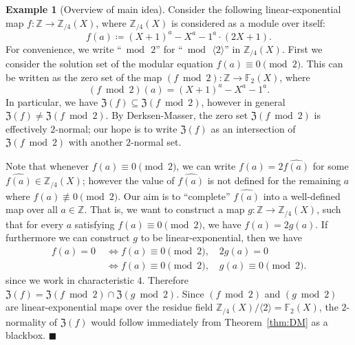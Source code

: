 \documentclass[letterpaper, 11pt, thm-restate]{article}
\numberwithin{equation}{section}
\newcommand{\Z}{\mathbb{Z}}
\newcommand{\F}{\mathbb{F}}
\newcommand{\mZ}{\mathfrak{Z}}
\newcommand{\gen}[1]{\langle {#1} \rangle}
\theoremstyle{definition}
\theoremstyle{definition}
\newtheorem{example}[theorem]{Example}
\theoremstyle{definition}
\begin{document}
\begin{example}[Overview of main idea]\label{example:modfour}
    Consider the following linear-exponential map $f \colon \Z \rightarrow \Z_{/4}(X)$, where $\Z_{/4}(X)$ is considered as a module over itself:
    \begin{equation}\label{eq:example_modfour}
        f(a) \coloneqq (X+1)^a - X^a - 1^a \cdot (2X+1).
    \end{equation}
    For convenience, we write ``$\bmod\, 2$'' for ``$\bmod\, \gen{2}$'' in $\Z_{/4}(X)$.
    First we consider the solution set of the modular equation
    $
    f(a) \equiv 0 \pmod 2
    $.
    This can be written as the zero set of the map $(f \bmod 2) \colon \Z \rightarrow \F_2(X)$, where %
    \[
    (f \bmod 2)(a) = (X+1)^a - X^a - 1^a.
    \]
    In particular, we have $\mZ(f) \subseteq \mZ(f \bmod 2)$, however in general $\mZ(f) \neq \mZ(f \bmod 2)$. 
    By Derksen-Masser, the zero set $\mZ(f \bmod 2)$ is effectively $2$-normal; our hope is to write $\mZ(f)$ as an intersection of $\mZ(f \bmod 2)$ with another $2$-normal set.

    Note that whenever $f(a) \equiv 0 \pmod{2}$, we can write $f(a) = 2 \widehat{f(a)}$ for some $\widehat{f(a)} \in \Z_{/4}(X)$; however the value of $\widehat{f(a)}$ is not defined for the remaining $a$ where $f(a) \not\equiv 0 \pmod{2}$.
    Our aim is to ``complete'' $\widehat{f(a)}$ into a well-defined map over all $a \in \Z$.
    That is, we want to construct a map $g \colon \Z \rightarrow \Z_{/4}(X)$, such that for every $a$ satisfying $f(a) \equiv 0 \pmod{2}$, we have $f(a) = 2g(a)$.
    If furthermore we can construct $g$ to be linear-exponential, then we have
    \begin{align*}
    f(a) = 0 &\; \iff f(a) \equiv 0 \pmod 2, \quad 2g(a) = 0 \\
    &\; \iff f(a) \equiv 0 \pmod 2, \quad g(a) \equiv 0 \pmod 2.
    \end{align*}
    since we work in characteristic $4$.
    Therefore $\mZ(f) = \mZ(f \bmod 2) \cap \mZ(g \bmod 2)$.
    Since $(f \bmod 2)$ and $(g \bmod 2)$ are linear-exponential maps over the residue field $\Z_{/4}(X)/\gen{2} = \F_2(X)$, the $2$-normality of $\mZ(f)$ would follow immediately from Theorem~\ref{thm:DM} as a blackbox.
    \hfill $\blacksquare$
\end{example}
\end{document}
